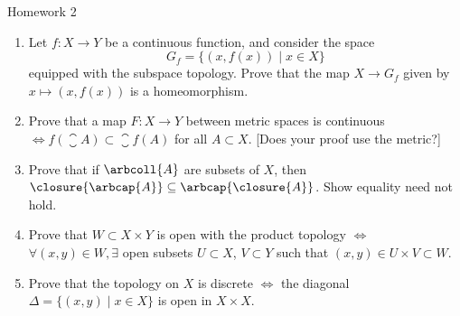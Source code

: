 \documentclass[12pt,letterpaper]{article}
\begin{document}
\pagestyle{fancy}
\begin{center}
{\Large Homework 2}%
\end{center}

\begin{enumerate}
\item Let $f:X\to Y$ be a continuous function, and consider the space
$$G_f=\{(x,f(x)) \mid x\in X\}$$
equipped with the subspace topology. Prove that the map $X\to G_f$ given by $x\mapsto (x,f(x))$ is a homeomorphism. 

\item Prove that a map $F:X\to Y$ between metric spaces is continuous $\iff f\left(\closure{A}\right)\subset\closure{f(A)}$ for all $A\subset X$. [Does your proof use the metric?]

\item Prove that if $\arbcoll{A}$ are subsets of $X$, then $\closure{\arbcap{A}}\subseteq\arbcap{\closure{A}}$. Show equality need not hold. 

\item Prove that $W\subset X\times Y$ is open with the product topology $\iff$ $\forall (x,y)\in W, \exists$ open subsets $U\subset X$, $V\subset Y$ such that $(x,y)\in U\times V\subset W$. 

\item Prove that the topology on $X$ is discrete $\iff$ the diagonal $\Delta = \{(x,y) \mid x\in X\}$ is open in $X\times X$. 


\end{enumerate}
\end{document}
